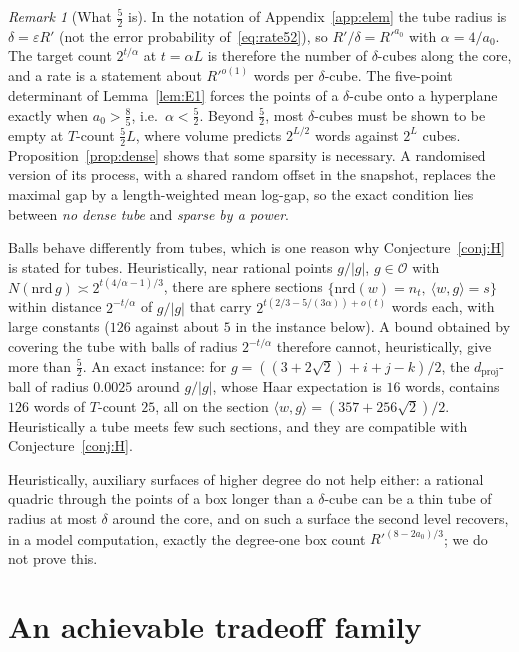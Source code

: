 \documentclass[aps,prx,twocolumn,superscriptaddress,nofootinbib,longbibliography]{revtex4-2}
\theoremstyle{plain}
\theoremstyle{definition}
\theoremstyle{remark}
\newtheorem{remark}{Remark}
\newcommand{\dproj}{d_{\mathrm{proj}}}
\begin{document}
\begin{remark}[What $\tfrac52$ is]\label{rem:what52}
In the notation of Appendix~\ref{app:elem} the tube radius is $\delta=\varepsilon R'$ (not the error probability of~\eqref{eq:rate52}), so $R'/\delta=R'^{a_0}$ with $\alpha=4/a_0$. The target count $2^{t/\alpha}$ at $t=\alpha L$ is therefore the number of $\delta$-cubes along the core, and a rate is a statement about $R'^{o(1)}$ words per $\delta$-cube. The five-point determinant of Lemma~\ref{lem:E1} forces the points of a $\delta$-cube onto a hyperplane exactly when $a_0>\tfrac85$, i.e.\ $\alpha<\tfrac52$. Beyond $\tfrac52$, most $\delta$-cubes must be shown to be empty at $T$-count $\tfrac52L$, where volume predicts $2^{L/2}$ words against $2^L$ cubes. Proposition~\ref{prop:dense} shows that some sparsity is necessary. A randomised version of its process, with a shared random offset in the snapshot, replaces the maximal gap by a length-weighted mean log-gap, so the exact condition lies between \emph{no dense tube} and \emph{sparse by a power}.

Balls behave differently from tubes, which is one reason why Conjecture~\ref{conj:H} is stated for tubes. Heuristically, near rational points $g/|g|$, $g\in\mathcal O$ with $N(\mathrm{nrd}\,g)\asymp2^{t(4/\alpha-1)/3}$, there are sphere sections $\{\mathrm{nrd}(w)=n_t,\ \langle w,g\rangle=s\}$ within distance $2^{-t/\alpha}$ of $g/|g|$ that carry $2^{t(2/3-5/(3\alpha))+o(t)}$ words each, with large constants ($126$ against about $5$ in the instance below). A bound obtained by covering the tube with balls of radius $2^{-t/\alpha}$ therefore cannot, heuristically, give more than $\tfrac52$. An exact instance: for $g=((3+2\sqrt2)+i+j-k)/2$, the $\dproj$-ball of radius $0.0025$ around $g/|g|$, whose Haar expectation is $16$ words, contains $126$ words of $T$-count $25$, all on the section $\langle w,g\rangle=(357+256\sqrt2)/2$. Heuristically a tube meets few such sections, and they are compatible with Conjecture~\ref{conj:H}.

Heuristically, auxiliary surfaces of higher degree do not help either: a rational quadric through the points of a box longer than a $\delta$-cube can be a thin tube of radius at most $\delta$ around the core, and on such a surface the second level recovers, in a model computation, exactly the degree-one box count $R'^{(8-2a_0)/3}$; we do not prove this.
\end{remark}
\section{An achievable tradeoff family}\label{sec:frontier}
\end{document}
